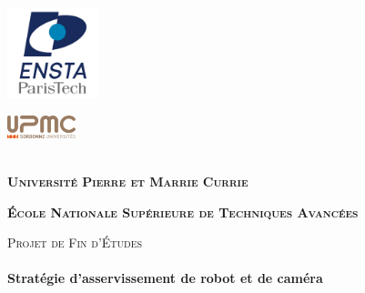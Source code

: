 \begin{titlepage}

	\begin{center}
	
	
		\begin{minipage}{0.45\textwidth}
		\begin{flushleft}
			\includegraphics[width=100px]{enstalogo.png}
		\end{flushleft}
		\end{minipage}
		\begin{minipage}{0.45\textwidth}
		\begin{flushright}
			\includegraphics[width=75px]{upmclogo.png}
		\end{flushright}
		\end{minipage}
		\mbox{}\\[1.5cm] 

		\textbf{ \textsc{\Large Université Pierre et Marrie Currie}\\[0.5cm] }
		
		\textbf{ \textsc{\Large École Nationale Supérieure de Techniques Avancées}\\[0.5cm]}
		
		\vfill
	
		\textsc{\large Projet de Fin d'Études}\\[0.5cm]
	
		\HRule \\[0.4cm]
		{ \huge \bfseries Stratégie d'asservissement de robot et de caméra}\\[0.15cm]
	
		      \HRule \\[1.5cm]
	                

\end{center}
\end{titlepage}
